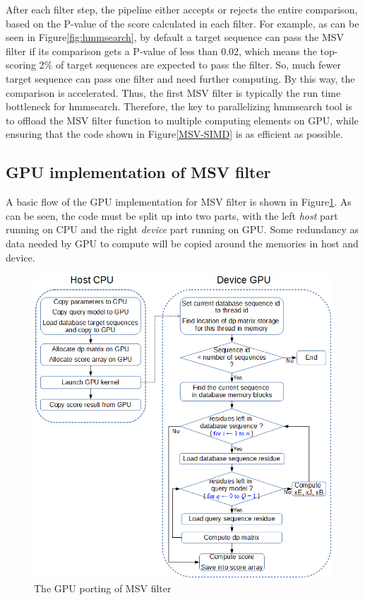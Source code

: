 \label{hmmsearch}
After each filter step, the pipeline either accepts or rejects the entire comparison, based on the P-value of the score calculated in each filter. For example, as can be seen in Figure\ref{fig:hmmsearch}, by default a target sequence can pass the MSV filter if its comparison gets a P-value of less than 0.02, which means the top-scoring 2\% of target sequences are expected to pass the filter. So, much fewer target sequence can pass one filter and need further computing. By this way, the comparison is accelerated. Thus, the first MSV filter is typically the run time bottleneck for hmmsearch. Therefore, the key to parallelizing hmmsearch tool is to offload the MSV filter function to multiple computing elements on GPU, while ensuring that the code shown in Figure\ref{MSV-SIMD} is as efficient as possible.

\subsection{GPU implementation of MSV filter}

A basic flow of the GPU implementation for MSV filter is shown in Figure\ref{fig:gpuMSV}. As can be seen, the code must be split up into two parts, with the left \emph{host} part running on CPU and the right \emph{device} part running on GPU. Some redundancy as data needed by GPU to compute will be copied around the memories in host and device.

\begin{figure}[!htb]
 \centering
 \includegraphics[totalheight=0.6\textheight]{Figures/gpuMSV.png}
 \caption{\selectfont The GPU porting of MSV filter}
 \label{fig:gpuMSV}
\end{figure}

